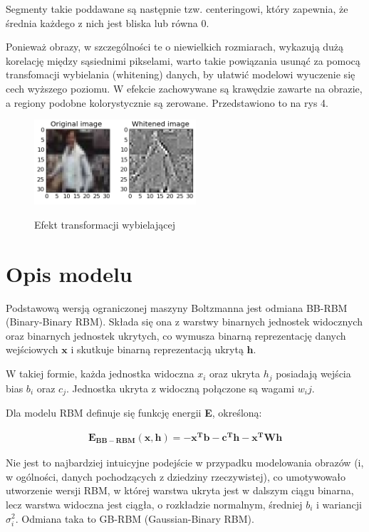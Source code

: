 \documentclass[a4paper,10pt]{article} %
\begin{document}
Segmenty takie poddawane są następnie tzw. centeringowi, który zapewnia, że średnia każdego z nich jest bliska lub równa 0.

Ponieważ obrazy, w szczególności te o niewielkich rozmiarach, wykazują dużą korelację między sąsiednimi pikselami, warto takie powiązania usunąć za pomocą transfomacji wybielania (whitening) danych, by ułatwić modelowi wyuczenie się cech wyższego poziomu. W efekcie zachowywane są krawędzie zawarte na obrazie, a regiony podobne kolorystycznie są zerowane. Przedstawiono to na rys 4.

\begin{figure}
 \centering
 \includegraphics[width=6cm]{imgs/whitening.png}
 \label{fig:whitening}
 \caption{Efekt transformacji wybielającej \cite{melchior2012}}
\end{figure}

\section{Opis modelu}

Podstawową wersją ograniczonej maszyny Boltzmanna jest odmiana BB-RBM (Binary-Binary RBM). Składa się ona z warstwy binarnych jednostek widocznych oraz binarnych jednostek ukrytych, co wymusza binarną reprezentację danych wejściowych $\mathbf{x}$ i skutkuje binarną reprezentacją ukrytą $\mathbf{h}$.

W takiej formie, każda jednostka widoczna $x_i$ oraz ukryta $h_j$ posiadają wejścia bias $b_i$ oraz $c_j$. Jednostka ukryta z widoczną połączone są wagami $w_ij$.

Dla modelu RBM definuje się funkcję energii \textbf{E}, określoną:

\begin{align}
	\mathbf{E_{BB-RBM}(x,h) = -x^Tb - c^Th - x^TWh}
\end{align}

Nie jest to najbardziej intuicyjne podejście w przypadku modelowania obrazów (i, w ogólności, danych pochodzących z dziedziny rzeczywistej), co umotywowało utworzenie wersji RBM, w której warstwa ukryta jest w dalszym ciągu binarna, lecz warstwa widoczna jest ciągła, o rozkładzie normalnym, średniej $b_i$ i wariancji $\sigma^2_i$. Odmiana taka to GB-RBM (Gaussian-Binary RBM).
\end{document}
